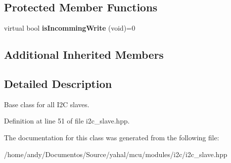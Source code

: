 \subsection*{Protected Member Functions}
\begin{DoxyCompactItemize}
\item 
\hypertarget{classyahal_1_1mcu_1_1_i2_c__slave_a452c58e3bfd632a4465809eee83f7784}{}virtual bool {\bfseries is\+Incomming\+Write} (void)=0\label{classyahal_1_1mcu_1_1_i2_c__slave_a452c58e3bfd632a4465809eee83f7784}

\end{DoxyCompactItemize}
\subsection*{Additional Inherited Members}


\subsection{Detailed Description}
Base class for all I2\+C slaves. 

Definition at line 51 of file i2c\+\_\+slave.\+hpp.



The documentation for this class was generated from the following file\+:\begin{DoxyCompactItemize}
\item 
/home/andy/\+Documentos/\+Source/yahal/mcu/modules/i2c/i2c\+\_\+slave.\+hpp\end{DoxyCompactItemize}
